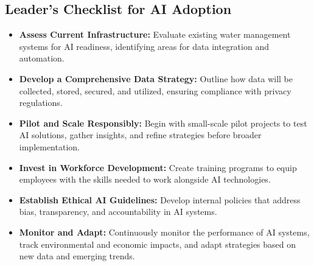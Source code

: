 \subsection{Leader's Checklist for AI Adoption}
\begin{itemize}
    \item \textbf{Assess Current Infrastructure:} Evaluate existing water management systems for AI readiness, identifying areas for data integration and automation.
    \item \textbf{Develop a Comprehensive Data Strategy:} Outline how data will be collected, stored, secured, and utilized, ensuring compliance with privacy regulations.
    \item \textbf{Pilot and Scale Responsibly:} Begin with small-scale pilot projects to test AI solutions, gather insights, and refine strategies before broader implementation.
    \item \textbf{Invest in Workforce Development:} Create training programs to equip employees with the skills needed to work alongside AI technologies.
    \item \textbf{Establish Ethical AI Guidelines:} Develop internal policies that address bias, transparency, and accountability in AI systems.
    \item \textbf{Monitor and Adapt:} Continuously monitor the performance of AI systems, track environmental and economic impacts, and adapt strategies based on new data and emerging trends.
\end{itemize}